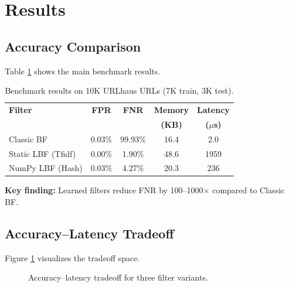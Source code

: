 \documentclass[11pt,a4paper]{article}
\begin{document}
\section{Results}

\subsection{Accuracy Comparison}

Table \ref{tab:results} shows the main benchmark results.

\begin{table}[H]
\centering
\begin{tabular}{@{}lcccc@{}}
\toprule
\textbf{Filter} & \textbf{FPR} & \textbf{FNR} & \textbf{Memory} & \textbf{Latency} \\
 & & & \textbf{(KB)} & \textbf{($\mu$s)} \\
\midrule
Classic BF & 0.03\% & 99.93\% & 16.4 & 2.0 \\
Static LBF (Tfidf) & 0.00\% & 1.90\% & 48.6 & 1959 \\
NumPy LBF (Hash) & 0.03\% & 4.27\% & 20.3 & 236 \\
\bottomrule
\end{tabular}
\caption{Benchmark results on 10K URLhaus URLs (7K train, 3K test).}
\label{tab:results}
\end{table}

\textbf{Key finding:} Learned filters reduce FNR by 100--1000$\times$ compared to Classic BF.

\subsection{Accuracy--Latency Tradeoff}

Figure \ref{fig:tradeoff} visualizes the tradeoff space.

\begin{figure}[H]
    \centering
    \caption{Accuracy--latency tradeoff for three filter variants.}
    \label{fig:tradeoff}
\end{figure}
\end{document}
